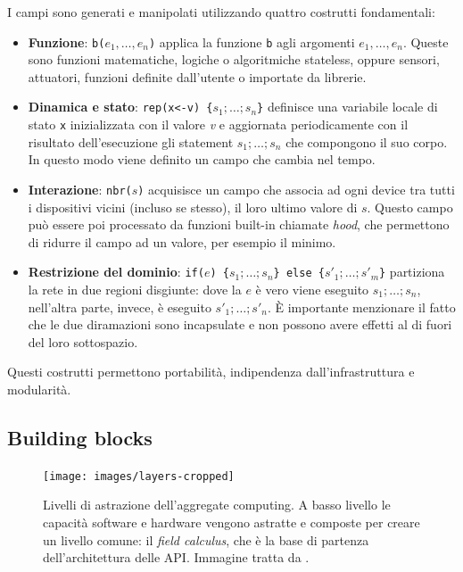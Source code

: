I campi sono generati e manipolati utilizzando quattro costrutti fondamentali:
\begin{itemize}
\item \textbf{Funzione}: \texttt{b($e_1,\ldots, e_n$)} applica la funzione \texttt{b}
  agli argomenti \texttt{$e_1,\ldots, e_n$}. Queste sono funzioni matematiche,
  logiche o algoritmiche stateless, oppure sensori, attuatori, funzioni definite
  dall'utente o importate da librerie.

\item \textbf{Dinamica e stato}: \texttt{rep(x<-v) \{$s_1;\ldots;s_n$\}} definisce una variabile
  locale di stato \texttt{x} inizializzata con il valore \textit{v} e aggiornata
  periodicamente con il risultato dell'esecuzione gli statement
  \texttt{{$s_1;\ldots;s_n$}} che compongono il suo corpo. In questo modo viene
  definito un campo che cambia nel tempo.

\item \textbf{Interazione}: \texttt{nbr($s$)} acquisisce un campo che associa ad ogni
  device tra tutti i dispositivi vicini (incluso se stesso), il loro ultimo
  valore di \texttt{$s$}. Questo campo può essere poi processato da funzioni
  built-in chiamate \textit{hood}, che permettono di ridurre il campo ad un
  valore, per esempio il minimo.

\item \textbf{Restrizione del dominio}: \texttt{if($e$) \{$s_1;\ldots;s_n$\} else
    \{$s'_1;\ldots;s'_m$\}} partiziona la rete in due regioni disgiunte: dove la
  \texttt{$e$} è vero viene eseguito \texttt{$s_1;\ldots;s_n$}, nell'altra parte,
  invece, è eseguito \texttt{$s'_1;\ldots;s'_n$}. È importante menzionare il
  fatto che le due diramazioni sono incapsulate e non possono avere effetti al
  di fuori del loro sottospazio.
\end{itemize}

Questi costrutti permettono portabilità, indipendenza dall'infrastruttura e
modularità.

\subsection{Building blocks}
\begin{figure}
  \centering
  \texttt{[image: images/layers-cropped]}
  \caption{Livelli di astrazione dell'aggregate computing. A basso livello le
    capacità software e hardware vengono astratte e composte per creare un
    livello comune: il \textit{field calculus}, che è la base di
    partenza dell'architettura delle API. Immagine tratta da \cite{Protelis}.}
  \label{fig:abstraction-layers}
\end{figure}

